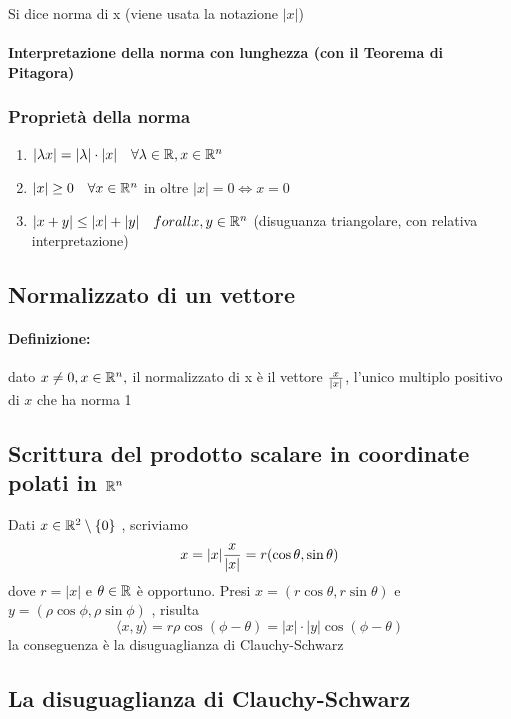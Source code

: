 \documentclass[a4paper]{article}
\begin{document}
Si dice norma di x (viene usata la notazione $|x|$)

\paragraph { Interpretazione della norma con lunghezza (con il Teorema di Pitagora) }

\subsubsection{Proprietà della norma}

\begin{enumerate}
	\item $ | \lambda x | = | \lambda | \cdot | x | \quad \forall \lambda \in \mathbb{R} , x \in \mathbb{R} ^ n $
	\item $ | x | \ge 0 \quad \forall x \in \mathbb{R} ^ n $ in oltre $ | x| =0 \iff x=0 $
	\item $ | x+y | \le |x| + |y| \quad forall x,y \in \mathbb{R} ^n$ (disuguanza triangolare, con relativa interpretazione)
\end{enumerate}

\subsection {Normalizzato di un vettore}
\paragraph{ Definizione: } dato $x \neq 0, x \in \mathbb{R} ^n, $ il normalizzato di x è il vettore $ x \over | x | $, l'unico multiplo positivo di $x$ che ha norma 1

\subsection{ Scrittura del prodotto scalare in coordinate polati in $ \mathbb{R} ^ n $}
Dati $ x \in \mathbb{R} ^ 2 \setminus \{ 0 \} $ , scriviamo 
$$
x= | x | { x \over |x| } = r ( \cos \theta , \sin \theta )
$$
dove $r=|x|$ e $\theta \in \mathbb{R}$ è opportuno. Presi $x = ( r \cos \theta, r \sin \theta)$ e $y=( \rho \cos \phi , \rho \sin \phi )$ , risulta
$$
\langle x,y \rangle = r \rho \cos ( \phi - \theta ) = |x| \cdot |y| \cos ( \phi - \theta ) 
$$
la conseguenza è la disuguaglianza di Clauchy-Schwarz

\subsection{ La disuguaglianza di Clauchy-Schwarz}
\end{document}

